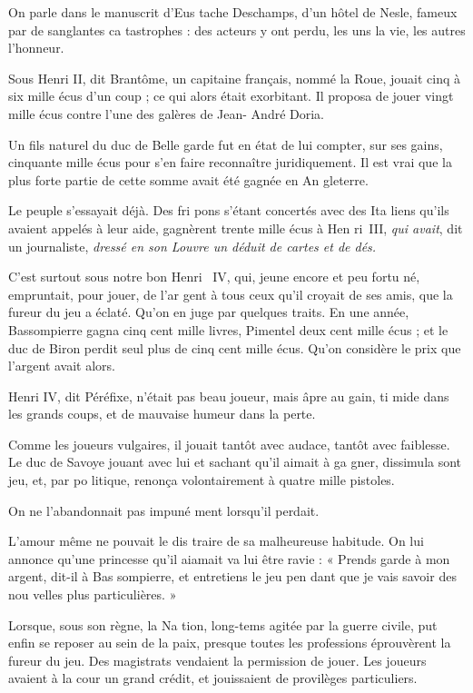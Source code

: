 On parle dans le manuscrit d'Eus%
tache Deschamps, d'un hôtel de
Nesle, fameux par de sanglantes ca%
tastrophes : des acteurs y ont perdu,
les uns la vie, les autres l'honneur.

Sous Henri II, dit Brantôme, un
capitaine français, nommé la Roue,
jouait cinq à six mille écus d'un
coup ; ce qui alors était exorbitant.
Il proposa de jouer vingt mille écus
contre l'une des galères de Jean-%
André Doria.

Un fils naturel du duc de Belle\-%
garde fut en état de lui compter, sur
ses gains, cinquante mille écus pour
s'en faire reconnaître juridiquement.
Il est vrai que la plus forte partie de
cette somme avait été gagnée en An%
gleterre.

Le peuple s'essayait déjà. Des fri%
pons s'étant concertés avec des Ita%
liens qu'ils avaient appelés à leur aide,
gagnèrent trente mille écus à Hen%
ri~III, \emph{qui avait}, dit un journaliste,
\emph{dressé en son Louvre un déduit de
cartes et de dés.}

C'est surtout sous notre bon Henri~
IV, qui, jeune encore et peu fortu%
né, empruntait, pour jouer, de l'ar%
gent à tous ceux qu'il croyait de ses
amis, que la fureur du jeu a éclaté.
Qu'on en juge par quelques traits. En
une année, Bassompierre gagna cinq
cent mille livres, Pimentel deux cent
mille écus ; et le duc de Biron perdit
seul plus de cinq cent mille écus.
Qu'on considère le prix que l'argent
avait alors.

Henri IV, dit Péréfixe, n'était pas
beau joueur, mais âpre au gain, ti%
mide dans les grands coups, et de
mauvaise humeur dans la perte.

Comme les joueurs vulgaires, il
jouait tantôt avec audace, tantôt avec
faiblesse. Le duc de Savoye jouant
avec lui et sachant qu'il aimait à ga%
gner, dissimula sont jeu, et, par po%
litique, renonça volontairement à
quatre mille pistoles.

On ne l'abandonnait pas impuné%
ment lorsqu'il perdait.

L'amour même ne pouvait le dis%
traire de sa malheureuse habitude.
On lui annonce qu'une princesse
qu'il aiamait va lui être ravie : « Prends
garde à mon argent, dit-il à Bas%
sompierre, et entretiens le jeu pen%
dant que je vais savoir des nou%
velles plus particulières. »

Lorsque, sous son règne, la Na%
tion, long-tems agitée par la guerre
civile, put enfin se reposer au sein de
la paix, presque toutes les professions
éprouvèrent la fureur du jeu. Des
magistrats vendaient la permission
de jouer. Les joueurs avaient à la
cour un grand crédit, et jouissaient
de provilèges particuliers.

